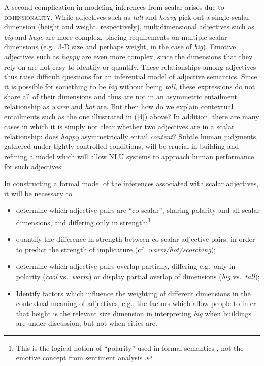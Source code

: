 \documentclass[10pt]{article}
\begin{document}
A second complication in modeling inferences from scalar arises due to \textsc{dimensionality}. While adjectives such as \emph{tall} and \emph{heavy} pick out a single scalar dimension (height and weight, respectively), multidimensional adjectives such as \emph{big} and \emph{huge} are more complex, placing requirements on multiple scalar dimensions (e.g., 3-D size and perhaps weight, in the case of \emph{big}). Emotive adjectives such as \emph{happy} are even more complex, since the dimensions that they rely on are not easy to identify or quantify. These relationships among adjectives thus raise difficult questions for an inferential model of adjective semantics. Since it is possible for something to be \emph{big} without being \emph{tall}, 
these expressions do not share all of their dimensions and thus are not in an asymmetric entailment relationship as \emph{warm} and \emph{hot} are. But then how do we explain contextual entailments such as the one illustrated in (\ref{4}) above? In addition, there are many cases in which it is simply not clear whether two adjectives are in a scalar relationship: does \emph{happy} asymmetrically entail \emph{content}? Subtle human judgments, gathered under tightly controlled conditions, will be crucial in building and refining a model which will allow NLU systems to approach human performance for such adjectives.

In constructing a formal model of the inferences associated with scalar adjectives, it will be necessary to 
 \vspace{-.25in}
\begin{itemize}
\item [1.] determine which adjective pairs are ``co-scalar'', sharing polarity and all scalar dimensions, and differing only in strength;\footnote{\label{polarity}This is the logical notion of ``polarity'' used in formal semantics \cite{kennedy2001polar}, not the emotive concept from sentiment analysis  \cite{wilson2009recognizing}.}
\item [2.]quantify the difference in strength between co-scalar adjective pairs, in order to predict the strength of implicature (cf.\ \emph{warm/hot/scorching});
\item [3.]determine which adjective pairs overlap partially, differing e.g.\ only in polarity (\emph{cool} vs.\ \emph{warm}) or display partial overlap of dimensions (\emph{big} vs.\ \emph{tall});
\item [4.] Identify factors which influence the weighting of different dimensions in the contextual meaning of adjectives, e.g., the factors which allow people to infer that height is the relevant size dimension in interpreting \emph{big} when buildings are under discussion, but not when cities are.
\end{itemize}
 \vspace{-.05in}
\end{document}
